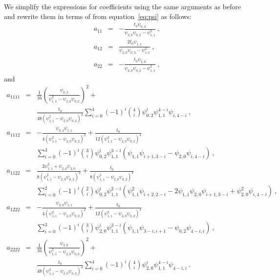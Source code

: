 We simplify the expressions for coefficients using the same arguments as before and rewrite them in terms of  from equation~\ref{eq:psi} as follows:
\begin{eqnarray}
\label{eq:lytruea2azi}
a_{11} & = & -\frac{t_0\psi_{0,2}}{\psi_{2,0}\psi_{0,2}-\psi^2_{1,1}}~,\\
\label{eq:lytruea2mazi}
a_{12} & = & \frac{2t_0\psi_{1,1}}{\psi_{2,0}\psi_{0,2}-\psi^2_{1,1}}~,\\
\label{eq:lytruea22azi}
a_{22} & = & -\frac{t_0\psi_{2,0}}{\psi_{2,0}\psi_{0,2}-\psi^2_{1,1}}~,
\end{eqnarray}
and
\begin{eqnarray}
\nonumber
a_{1111} & = & \frac{1}{16}\left(\frac{\psi_{0,2}}{\psi^2_{1,1}-\psi_{2,0}\psi_{0,2}}\right)^2 + \\
\label{eq:lytruea4m1azi}
&&\frac{t_0}{48 (\psi^2_{1,1}-\psi_{2,0}\psi_{0,2})^4}\sum\limits_{i=0}^4 (-1)^{i} \binom{4}{i} \psi^i_{0,2} \psi^{4-i}_{1,1} \psi_{i,4-i}~,\\
\label{eq:lytruea4m1azi}
a_{1112} & = & -\frac{\psi_{0,2}\psi_{1,1}}{4(\psi^2_{1,1}-\psi_{2,0}\psi_{0,2})^2} +\frac{t_0}{12(\psi^2_{1,1}-\psi_{2,0}\psi_{0,2})^4} \\
\nonumber
&&\sum\limits_{i=0}^3 (-1)^{i} \binom{3}{i} \psi^{i}_{0,2}\psi^{3-i}_{1,1}(\psi_{1,1}\psi_{i+1,3-i}-\psi_{2,0}\psi_{i,4-i})~,\\
\label{eq:lytruea4mazi}
a_{1122} & = & \frac{2\psi_{1,1}^2+\psi_{2,0}\psi_{2,0}}{8(\psi^2_{1,1}-\psi_{2,0}\psi_{0,2})^2} +\frac{t_0}{8(\psi^2_{1,1}-\psi_{2,0}\psi_{0,2})^4}\\
\nonumber
&& \sum\limits_{i=0}^2 (-1)^{i} \binom{2}{i} \psi^{i}_{0,2}\psi^{2-i}_{1,1}(\psi^2_{1,1}\psi_{i+2,2-i}-2\psi_{1,1}\psi_{2,0}\psi_{i+1,3-i}+\psi^2_{2,0}\psi_{i,4-i})~,\\
\label{eq:lytruea4m2azi} 
a_{1222} & = &  -\frac{\psi_{2,0}\psi_{1,1}}{4(\psi^2_{1,1}-\psi_{2,0}\psi_{0,2})^2} + \frac{t_0}{12(\psi^2_{1,1}-\psi_{2,0}\psi_{0,2})^4} \\
\nonumber
&&\sum\limits_{i=0}^3 (-1)^{i} \binom{3}{i} \psi^{i}_{2,0}\psi^{3-i}_{1,1}(\psi_{1,1}\psi_{3-i,i+1}-\psi_{0,2}\psi_{4-i,i})~,\\
\nonumber
a_{2222} & = & \frac{1}{16}\left(\frac{\psi_{2,0}}{\psi^2_{1,1}-\psi_{2,0}\psi_{0,2}}\right)^2 + \\
\label{eq:lytruea42azi}
&& \frac{t_0}{48 (\psi^2_{1,1}-\psi_{2,0}\psi_{0,2})^4}\sum\limits_{i=0}^4 (-1)^{i} \binom{4}{i} \psi^i_{2,0} \psi^{4-i}_{1,1} \psi_{4-i,i}~.
\end{eqnarray}
